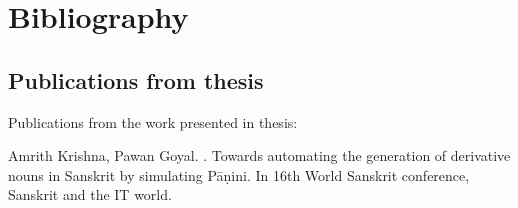 \documentclass[a4paper,11pt,twoside,openright]{report}
\begin{document}
\clearpage
\titlespacing*{\chapter}{0pt}{-50pt}{40pt}
\chapter*{Bibliography}


\vspace{-50pt}
\begin{thebibliography}{50}






\end{thebibliography}
\cleardoublepage
{}

\begin{appendices}

\chapter {Publications from thesis}

Publications from the work presented in thesis:

\begingroup
\renewcommand{\chapter}[2]{}
\begin {thebibliography}{}
Amrith Krishna, Pawan Goyal.
.
\newblock Towards automating the generation of derivative nouns in Sanskrit by simulating Pāṇini. 
\newblock In 16th World Sanskrit conference, Sanskrit and the IT world.
\end{thebibliography}
\endgroup

\end{appendices}
\end{document}
